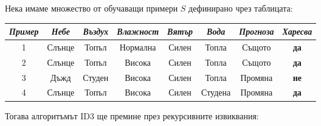\documentclass[12pt]{article}
\begin{document}
	Нека имаме множество от обучаващи примери $S$ дефинирано чрез таблицата:
	\newline
	\begin{table}[!h]
	\centering
		\begin{tabular}{|c|c|c|c|c|c|c|c|}
			\hline
			\textit{Пример} & \textit{Небе} & \textit{Въздух} & \textit{Влажност} & \textit{Вятър} & \textit{Вода} & \textit{Прогноза} & \textit{Харесва} \\ \hline
			1               & Слънце        & Топъл           & Нормална          & Силен          & Топла         & Същото            & \textbf{да}      \\ \hline
			2               & Слънце        & Топъл           & Висока            & Силен          & Топла         & Същото            & \textbf{да}      \\ \hline
			3               & Дъжд          & Студен          & Висока            & Силен          & Топла         & Промяна           & \textbf{не}      \\ \hline
			4               & Слънце        & Топъл           & Висока            & Силен          & Студена       & Промяна           & \textbf{да}      \\ \hline
		\end{tabular}
	\end{table}
	\newline\newline
	Тогава алгоритъмът ID3 ще премине през рекурсивните извиквания:\newline
	
\end{document}
